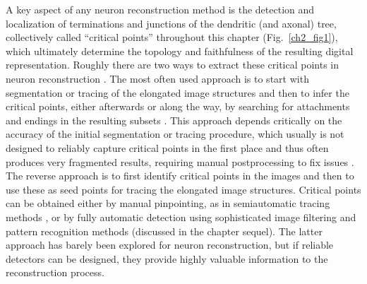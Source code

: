 A key aspect of any neuron reconstruction method is the detection and localization of terminations and junctions of the dendritic (and axonal) tree, collectively called ``critical points'' throughout this chapter (Fig.~\ref{ch2_fig1}), which ultimately determine the topology and faithfulness of the resulting digital representation. Roughly there are two ways to extract these critical points in neuron reconstruction \cite{al2008improved, meijering2010neuron, basu2013segmentation}. The most often used approach is to start with segmentation or tracing of the elongated image structures and then to infer the critical points, either afterwards or along the way, by searching for attachments and endings in the resulting subsets \cite{dima2002automatic, xiong2006automated, narro2007neuronmetrics, vasilkoski2009detection, bas2011principal, chothani2011automated, dehmelt2011neuritequant, ho2011neurphologyj, choromanska2012automatic, xiao2013app2}. This approach depends critically on the accuracy of the initial segmentation or tracing procedure, which usually is not designed to reliably capture critical points in the first place and thus often produces very fragmented results, requiring manual postprocessing to fix issues \cite{peng2011proof, luisi2011farsight, dercksen2014filament}. The reverse approach is to first identify critical points in the images and then to use these as seed points for tracing the elongated image structures. Critical points can be obtained either by manual pinpointing, as in semiautomatic tracing methods \cite{meijering2004design, schmitt2004new, narro2007neuronmetrics, lu2009semi, peng2010v3d, longair2011simple}, or by fully automatic detection using sophisticated image filtering and pattern recognition methods (discussed in the chapter sequel). The latter approach has barely been explored for neuron reconstruction, but if reliable detectors can be designed, they provide highly valuable information to the reconstruction process.

